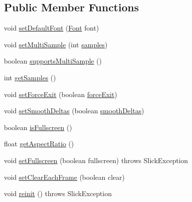 \subsection*{Public Member Functions}
\begin{DoxyCompactItemize}
\item 
void \mbox{\hyperlink{classorg_1_1newdawn_1_1slick_1_1_game_container_a95487dc9d4b9b57e879a30bd4f551f6f}{set\+Default\+Font}} (\mbox{\hyperlink{interfaceorg_1_1newdawn_1_1slick_1_1_font}{Font}} font)
\item 
void \mbox{\hyperlink{classorg_1_1newdawn_1_1slick_1_1_game_container_a5d16330dd52b379bb82725524e0af88c}{set\+Multi\+Sample}} (int \mbox{\hyperlink{classorg_1_1newdawn_1_1slick_1_1_game_container_af37ac6c2d7d33d4fac82860184cafff6}{samples}})
\item 
boolean \mbox{\hyperlink{classorg_1_1newdawn_1_1slick_1_1_game_container_ad9fbc79ea908ad3d82d274e9614747ad}{supports\+Multi\+Sample}} ()
\item 
int \mbox{\hyperlink{classorg_1_1newdawn_1_1slick_1_1_game_container_a70164ae56bf8a12fdd9108c9d9683185}{get\+Samples}} ()
\item 
void \mbox{\hyperlink{classorg_1_1newdawn_1_1slick_1_1_game_container_af7539008df0bf3bb0e11a16173abe524}{set\+Force\+Exit}} (boolean \mbox{\hyperlink{classorg_1_1newdawn_1_1slick_1_1_game_container_afda255df5a0dc9c1a22e5a169c0176c5}{force\+Exit}})
\item 
void \mbox{\hyperlink{classorg_1_1newdawn_1_1slick_1_1_game_container_a5e7a13f0c4752a6977f908572592bbea}{set\+Smooth\+Deltas}} (boolean \mbox{\hyperlink{classorg_1_1newdawn_1_1slick_1_1_game_container_ae27109ea0f24484683365b54667b2825}{smooth\+Deltas}})
\item 
boolean \mbox{\hyperlink{classorg_1_1newdawn_1_1slick_1_1_game_container_a320dea546301aa5256e14c4da2142534}{is\+Fullscreen}} ()
\item 
float \mbox{\hyperlink{classorg_1_1newdawn_1_1slick_1_1_game_container_a5be60e50a359e3bb3861e06a8b149901}{get\+Aspect\+Ratio}} ()
\item 
void \mbox{\hyperlink{classorg_1_1newdawn_1_1slick_1_1_game_container_aa658465ec67e57442201b1d72d24ac04}{set\+Fullscreen}} (boolean fullscreen)  throws Slick\+Exception 
\item 
void \mbox{\hyperlink{classorg_1_1newdawn_1_1slick_1_1_game_container_a2336f79abc6f026930ddc9994f7eccbb}{set\+Clear\+Each\+Frame}} (boolean clear)
\item 
void \mbox{\hyperlink{classorg_1_1newdawn_1_1slick_1_1_game_container_ac7f96cd2a8598d125a7ba4ce6c1e2b6a}{reinit}} ()  throws Slick\+Exception 

\end{DoxyCompactItemize}
